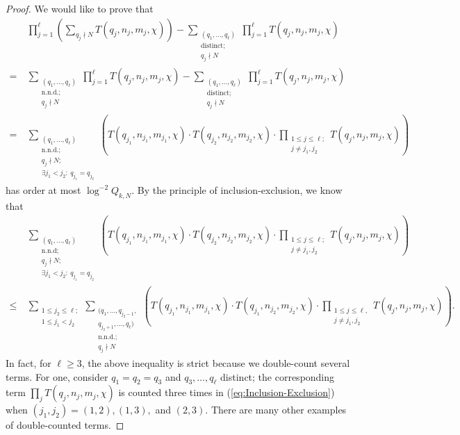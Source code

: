 \documentclass[12pt, reqno,oneside]{amsart}
\theoremstyle{plain}
\theoremstyle{definition}
\theoremstyle{remark}
\theoremstyle{plain}
\numberwithin{equation}{section}
\begin{document}
\begin{proof}
We would like to prove that
\begin{align}
\nonumber& \prod_{j=1}^\ell\left(\sum_{q_j\nmid N}T(q_j,n_j,m_j,\chi)\right) - \sum_{\substack{(q_1,\dots,q_\ell) \\ \text{distinct;} \\ q_j\nmid N}}\prod_{j=1}^\ell T(q_j,n_j,m_j,\chi) \\
\nonumber= \ & \sum_{\substack{(q_1,\dots,q_\ell) \\ \text{n.n.d.}; \\ q_j\nmid N}}\prod_{j=1}^\ell T(q_j,n_j,m_j,\chi) - \sum_{\substack{(q_1,\dots,q_\ell) \\ \text{distinct;} \\ q_j\nmid N}}\prod_{j=1}^\ell T(q_j,n_j,m_j,\chi) \\
\label{eq: Error 0.1}
= \ & \sum_{\substack{(q_1,\dots,q_\ell) \\ \text{n.n.d.}; \\ q_j\nmid N; \\ \exists j_1<j_2: \ q_{j_1}=q_{j_2}}}\left(T(q_{j_1},n_{j_1},m_{j_1},\chi)\cdot T(q_{j_2},n_{j_2},m_{j_2},\chi)\cdot\prod_{\substack{1\leq j\leq\ell; \\ j\neq j_1, j_2}} T(q_j,n_j,m_j,\chi)\right)
\end{align} 
has order at most $\log^{-2}Q_{k,N}$. By the principle of inclusion-exclusion, we know that
\begin{align}
\nonumber& \sum_{\substack{(q_1,\dots,q_\ell) \\ \text{n.n.d}; \\ q_j\nmid N; \\ \exists j_1<j_2: \ q_{j_1}=q_{j_2}}}\left(T(q_{j_1},n_{j_1},m_{j_1},\chi)\cdot T(q_{j_2},n_{j_2},m_{j_2},\chi)\cdot\prod_{\substack{1\leq j\leq\ell; \\ j\neq j_1, j_2}} T(q_j,n_j,m_j,\chi)\right)\\
\label{eq:Inclusion-Exclusion}
\leq \ & \sum_{\substack{1\leq j_2\leq \ell;\\1\leq j_1<j_2}}\sum_{\substack{(q_1,\dots,q_{j_2-1},\\ q_{j_2+1},\dots,q_\ell) \\ \text{n.n.d.}; \\ q_j\nmid N}}\left(T(q_{j_1},n_{j_1},m_{j_1},\chi)\cdot T(q_{j_1},n_{j_2},m_{j_2},\chi)\cdot\prod_{\substack{1\leq j\leq\ell, \\ j\neq j_1, j_2}} T(q_j,n_j,m_j,\chi)\right).
\end{align} 
In fact, for $\ell\geq3$, the above inequality is strict because we double-count several terms. For one, consider $q_1=q_2=q_3$ and $q_3,\ldots,q_\ell$ distinct; the corresponding term $\prod_{j}T(q_j,n_j,m_j,\chi)$ is counted three times in (\ref{eq:Inclusion-Exclusion}) when $(j_1,j_2)=(1,2),(1,3),$ and $(2,3)$. There are many other examples of double-counted terms. 


\end{proof}
\end{document}
